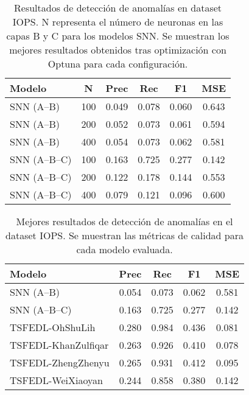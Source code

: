 \begin{table}[htbp]
\centering
\small
\begin{tabular}{lccccc}
\hline\hline
\textbf{Modelo} & \textbf{N} & \textbf{Prec} & \textbf{Rec} & \textbf{F1} & \textbf{MSE} \\
\hline
SNN (A--B) & 100 & 0.049 & 0.078 & 0.060 & 0.643 \\
SNN (A--B) & 200 & 0.052 & 0.073 & 0.061 & 0.594 \\
SNN (A--B) & 400 & 0.054 & 0.073 & 0.062 & 0.581 \\
\hline
SNN (A--B--C) & 100 & 0.163 & 0.725 & 0.277 & 0.142 \\
SNN (A--B--C) & 200 & 0.122 & 0.178 & 0.144 & 0.553 \\
SNN (A--B--C) & 400 & 0.079 & 0.121 & 0.096 & 0.600 \\
\hline\hline
\end{tabular}
\caption{Resultados de detección de anomalías en dataset IOPS. N representa el número de neuronas en las capas B y C para los modelos SNN. Se muestran los mejores resultados obtenidos tras optimización con Optuna para cada configuración.}
\label{tab:resultados-iops-escalabilidad}
\end{table}


\begin{table}[htbp]
\centering
\small
\begin{tabular}{lcccc}
\hline\hline
\textbf{Modelo} & \textbf{Prec} & \textbf{Rec} & \textbf{F1} & \textbf{MSE} \\
\hline
SNN (A--B) & 0.054 & 0.073 & 0.062 & 0.581 \\
SNN (A--B--C) & 0.163 & 0.725 & 0.277 & 0.142 \\
TSFEDL-OhShuLih & 0.280 & 0.984 & 0.436 & 0.081 \\
TSFEDL-KhanZulfiqar & 0.263 & 0.926 & 0.410 & 0.078 \\
TSFEDL-ZhengZhenyu & 0.265 & 0.931 & 0.412 & 0.095 \\
TSFEDL-WeiXiaoyan & 0.244 & 0.858 & 0.380 & 0.142 \\
\hline\hline
\end{tabular}
\caption{Mejores resultados de detección de anomalías en el dataset IOPS. Se muestran las métricas de calidad para cada modelo evaluada.}
\label{tab:resultados-iops}
\end{table}

